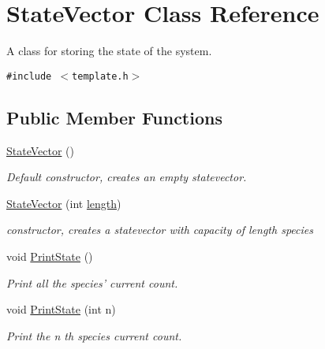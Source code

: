 \hypertarget{class_state_vector}{
\section{StateVector Class Reference}
\label{class_state_vector}
}
A class for storing the state of the system.  


{\tt \#include $<$template.h$>$}

\subsection*{Public Member Functions}
\begin{CompactItemize}
\item 
\hyperlink{class_state_vector_6559f412ce6cc17afbb958139961010f}{StateVector} ()
\begin{CompactList}\small\item\em Default constructor, creates an empty statevector. \item\end{CompactList}\item 
\hyperlink{class_state_vector_ea1d10f89c3a7d9e91244b6416018b52}{StateVector} (int \hyperlink{class_state_vector_ff012ea1d77d2ca71e36b47960d45db8}{length})
\begin{CompactList}\small\item\em constructor, creates a statevector with capacity of length species \item\end{CompactList}\item 
\hypertarget{class_state_vector_83a65ed11ab5672b5da25e2adde72836}{
void \hyperlink{class_state_vector_83a65ed11ab5672b5da25e2adde72836}{PrintState} ()}
\label{class_state_vector_83a65ed11ab5672b5da25e2adde72836}

\begin{CompactList}\small\item\em Print all the species' current count. \item\end{CompactList}\item 
\hypertarget{class_state_vector_27b1209233e8ce24885b0cf24042af59}{
void \hyperlink{class_state_vector_27b1209233e8ce24885b0cf24042af59}{PrintState} (int n)}
\label{class_state_vector_27b1209233e8ce24885b0cf24042af59}

\begin{CompactList}\small\item\em Print the n th species current count. \item\end{CompactList}\end{CompactItemize}
